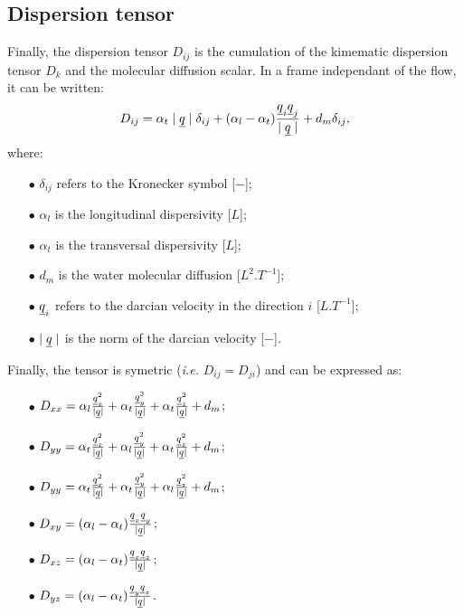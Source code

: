 \subsection{Dispersion tensor}
Finally, the dispersion tensor $D_{ij}$ is the cumulation of the kimematic dispersion tensor $D_k$ and the molecular diffusion scalar.
In a frame independant of the flow, it can be written:
\begin{equation}\label{eq:groundwater:formul_disp}
 D_{ij}= \alpha_t \mid \underline{q} \mid \delta_{ij} + (\alpha_l - \alpha_t) \frac{\underline{q}_i \underline{q}_j}{\mid \underline{q} \mid} + d_m \delta_{ij},
\end{equation}
where:
\begin{itemize}
 \item[$\bullet$] $\delta_{ij}$ refers to the Kronecker symbol [$-$];
 \item[$\bullet$] $\alpha_l$ is the longitudinal dispersivity [$L$];
 \item[$\bullet$] $\alpha_t$ is the transversal dispersivity [$L$];
 \item[$\bullet$] $d_m$ is the water molecular diffusion [$L^2.T^{-1}$];
 \item[$\bullet$] $\underline{q}_i$ refers to the darcian velocity in the direction $i$ [$L.T^{-1}$];
 \item[$\bullet$] $\mid \underline{q} \mid$ is the norm of the darcian velocity [$-$].
\end{itemize}
Finally, the tensor is symetric (\emph{i.e.} $D_{ij}=D_{ji}$) and can be expressed as:
\begin{itemize}
 \item[$\bullet$] $D_{xx}=\alpha_l\frac{\underline{q}_x^2}{\mid \underline{q} \mid}+\alpha_t\frac{\underline{q}_y^2}{\mid \underline{q} \mid}+\alpha_t \frac{\underline{q}_z^2}{\mid \underline{q} \mid}+d_m$;
 \item[$\bullet$] $D_{yy}=\alpha_t\frac{\underline{q}_x^2}{\mid \underline{q} \mid}+\alpha_l\frac{\underline{q}_y^2}{\mid \underline{q} \mid}+\alpha_t \frac{\underline{q}_z^2}{\mid \underline{q} \mid}+d_m$;
 \item[$\bullet$] $D_{yy}=\alpha_t\frac{\underline{q}_x^2}{\mid \underline{q} \mid}+\alpha_t\frac{\underline{q}_y^2}{\mid \underline{q} \mid}+\alpha_l \frac{\underline{q}_z^2}{\mid \underline{q} \mid}+d_m$;
 \item[$\bullet$] $D_{xy}=(\alpha_l - \alpha_t) \frac{\underline{q}_x \underline{q}_y}{\mid \underline{q} \mid}$;
 \item[$\bullet$] $D_{xz}=(\alpha_l - \alpha_t) \frac{\underline{q}_x \underline{q}_z}{\mid \underline{q} \mid}$;
 \item[$\bullet$] $D_{yz}=(\alpha_l - \alpha_t) \frac{\underline{q}_y \underline{q}_z}{\mid \underline{q} \mid}$.
\end{itemize}

